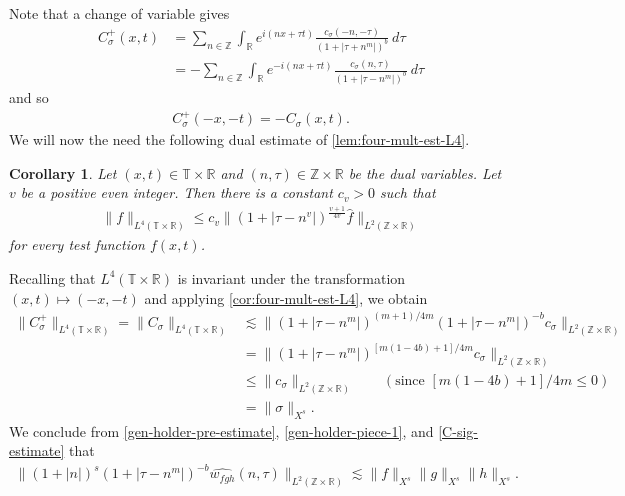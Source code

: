 \documentclass[12pt,reqno]{amsart}
\numberwithin{equation}{section}  %
\numberwithin{figure}{section}
\newcommand{\rr}{\mathbb{R}}
\newcommand{\zz}{\mathbb{Z}}
\newcommand{\ci}{\mathbb{T}}
\newcommand{\wh}{\widehat}
\theoremstyle{plain}
\newtheorem{corollary}{Corollary}
\theoremstyle{definition}
\theoremstyle{remark}
\begin{document}
%
%
Note that a change of variable gives
%
%
\begin{equation*}
	\begin{split}
		C_\sigma^+(x, t)
		& = \sum_{n \in \zz} \int_\rr e^{i(nx +  \tau t)} \frac{c_\sigma\left( -n, -\tau \right)}{\left( 
		1 + | \tau + n^{m } | \right)^{b}} \ d \tau
		\\
		& = - \sum_{n \in \zz} \int_\rr e^{-i(nx +   \tau t )}
		\frac{c_\sigma\left( n, \tau \right)}{\left( 
		1 + | \tau - n^{m } | \right)^{b}} \ d \tau
	\end{split}
\end{equation*}
%
%
and so
%
%
\begin{equation*}
	\begin{split}
		C_\sigma^+(-x, -t) = -C_\sigma(x, t).
	\end{split}
\end{equation*}
%
%
We will now the need the following dual estimate of
\autoref{lem:four-mult-est-L4}.
%
\begin{corollary}
	\label{cor:four-mult-est-L4}
	Let $(x, t) \in \ci \times \rr $ and $(n, \tau) \in \zz \times \rr$ be 
	the dual variables. Let $v$ be a positive even integer. Then there is a 
	constant $c_v > 0$ such that
%
%
\begin{equation}
	\label{four-mult-est-L4}
	\begin{split}
		\|f\|_{L^4(\ci \times \rr)} \le c_v \|\left( 1 + | \tau - n^v | 
		\right)^\frac{v+1}{4v} \wh{f} \|_{L^2( \zz \times \rr)}
	\end{split}
\end{equation}
for every test function $f(x, t)$. 
%
%
%
%
\end{corollary}
%
%
Recalling that $L^4(\ci \times \rr)$ is invariant under the transformation $(x, 
t) \mapsto (-x,-t)$ and applying 
\autoref{cor:four-mult-est-L4}, we obtain
%
%
\begin{equation}
	\label{C-sig-estimate}
	\begin{split}
		\| C^+_\sigma \|_{L^4(\ci \times \rr)} = \|C_\sigma \|_{L^4(\ci \times \rr)} 
		& \lesssim \|\left( 1 + | \tau - n^{m } | 
		\right)^{(m +1)/4m} \left( 1 + | \tau - n^{m } | 
		\right)^{-b} c_\sigma \|_{L^2(\zz \times \rr)}
		\\
		& = \|\left( 1 + | \tau - n^{m } | 
		\right)^{[m(1 - 4b) + 1]/4m } c_\sigma \|_{L^2(\zz \times \rr)}
		\\
		& \le \|c_\sigma \|_{L^2(\zz \times \rr)}  \qquad (\text{since  } [m(1 - 4b) + 
		1]/4m \le 0)
		\\
		& = \|\sigma\|_{X^s}.
	\end{split}
\end{equation}
%
%
We conclude from \eqref{gen-holder-pre-estimate}, \eqref{gen-holder-piece-1}, 
and \eqref{C-sig-estimate} that
%
%
%
%
\begin{equation*}
	\begin{split}
		\| \left( 1 + |n | \right)^s \left( 1 + | \tau - n^{m} | \right)^{-b} \wh{w_{fgh}} 
		(n, \tau) \|_{L^2(\zz \times \rr)} \lesssim 
		\|f\|_{X^s}\|g\|_{X^s}\|h\|_{X^s}.
	\end{split}
\end{equation*}
%
%
%
%
%
%
%
\end{document}
